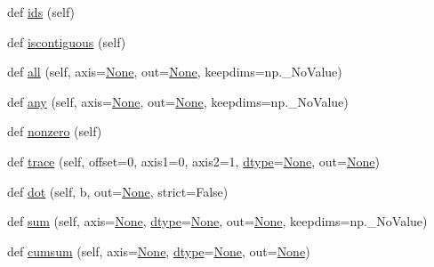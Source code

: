 \begin{DoxyCompactItemize}
\item 
def \hyperlink{classnumpy_1_1ma_1_1core_1_1MaskedArray_abc84affce037f8d0a8c6edf981cd295f}{ids} (self)
\item 
def \hyperlink{classnumpy_1_1ma_1_1core_1_1MaskedArray_aed7e048897a014b22a53de87bf273bb5}{iscontiguous} (self)
\item 
def \hyperlink{classnumpy_1_1ma_1_1core_1_1MaskedArray_a9686c7668cd38db0a2a75d11897a1b7f}{all} (self, axis=\hyperlink{namespacenumpy_1_1ma_1_1core_a647ee1848dfa3692fe35a663a2aa40b3}{None}, out=\hyperlink{namespacenumpy_1_1ma_1_1core_a647ee1848dfa3692fe35a663a2aa40b3}{None}, keepdims=np.\+\_\+\+No\+Value)
\item 
def \hyperlink{classnumpy_1_1ma_1_1core_1_1MaskedArray_a3243f2c272fd2cb57371f1f73dd27d5e}{any} (self, axis=\hyperlink{namespacenumpy_1_1ma_1_1core_a647ee1848dfa3692fe35a663a2aa40b3}{None}, out=\hyperlink{namespacenumpy_1_1ma_1_1core_a647ee1848dfa3692fe35a663a2aa40b3}{None}, keepdims=np.\+\_\+\+No\+Value)
\item 
def \hyperlink{classnumpy_1_1ma_1_1core_1_1MaskedArray_a2e48ff55563cd2b57b8183bd8192d062}{nonzero} (self)
\item 
def \hyperlink{classnumpy_1_1ma_1_1core_1_1MaskedArray_abaa23c4f6196ff1c127fb41cb107762b}{trace} (self, offset=0, axis1=0, axis2=1, \hyperlink{classnumpy_1_1ma_1_1core_1_1MaskedArray_acaf5e9f1356ae9652fc4eddef5878b18}{dtype}=\hyperlink{namespacenumpy_1_1ma_1_1core_a647ee1848dfa3692fe35a663a2aa40b3}{None}, out=\hyperlink{namespacenumpy_1_1ma_1_1core_a647ee1848dfa3692fe35a663a2aa40b3}{None})
\item 
def \hyperlink{classnumpy_1_1ma_1_1core_1_1MaskedArray_a721df29c0390812be809cb70d481dc99}{dot} (self, b, out=\hyperlink{namespacenumpy_1_1ma_1_1core_a647ee1848dfa3692fe35a663a2aa40b3}{None}, strict=False)
\item 
def \hyperlink{classnumpy_1_1ma_1_1core_1_1MaskedArray_ac2711ac7b9660a343b008adb674cbb39}{sum} (self, axis=\hyperlink{namespacenumpy_1_1ma_1_1core_a647ee1848dfa3692fe35a663a2aa40b3}{None}, \hyperlink{classnumpy_1_1ma_1_1core_1_1MaskedArray_acaf5e9f1356ae9652fc4eddef5878b18}{dtype}=\hyperlink{namespacenumpy_1_1ma_1_1core_a647ee1848dfa3692fe35a663a2aa40b3}{None}, out=\hyperlink{namespacenumpy_1_1ma_1_1core_a647ee1848dfa3692fe35a663a2aa40b3}{None}, keepdims=np.\+\_\+\+No\+Value)
\item 
def \hyperlink{classnumpy_1_1ma_1_1core_1_1MaskedArray_a4db33f1e59fc42d11eb845a65ed2160d}{cumsum} (self, axis=\hyperlink{namespacenumpy_1_1ma_1_1core_a647ee1848dfa3692fe35a663a2aa40b3}{None}, \hyperlink{classnumpy_1_1ma_1_1core_1_1MaskedArray_acaf5e9f1356ae9652fc4eddef5878b18}{dtype}=\hyperlink{namespacenumpy_1_1ma_1_1core_a647ee1848dfa3692fe35a663a2aa40b3}{None}, out=\hyperlink{namespacenumpy_1_1ma_1_1core_a647ee1848dfa3692fe35a663a2aa40b3}{None})

\end{DoxyCompactItemize}
